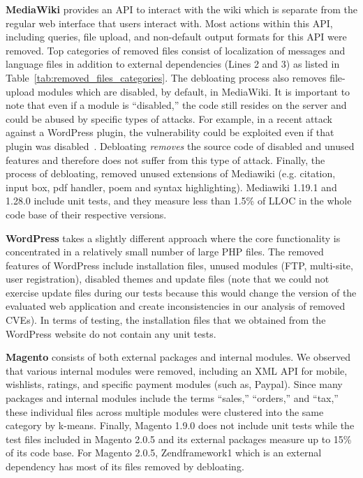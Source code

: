 \vspace{0.5ex}
\noindent\textbf{MediaWiki} provides an API to interact with the wiki which is separate from the regular web interface that users interact with. Most actions within this API, including queries, file upload, and non-default output formats for this API were removed. Top categories of removed files consist of localization of messages and language files in addition to external dependencies (Lines 2 and 3) as listed in Table~\ref{tab:removed_files_categories}. The debloating process also removes file-upload modules which are disabled, by default, in MediaWiki. It is important to note that even if a module is ``disabled,'' the code still resides on the server and could be abused by specific types of attacks. For example, in a recent attack against a WordPress plugin, the vulnerability could be exploited even if that plugin was disabled~\cite{wordpressPlugin}. Debloating \textit{removes} the source code of disabled and unused features and therefore does not suffer from this type of attack.
Finally, the process of debloating, removed unused extensions of Mediawiki (e.g. citation, input box, pdf handler, poem and syntax highlighting). Mediawiki 1.19.1 and 1.28.0 include unit tests, and they measure less than 1.5\% of LLOC in the whole code base of their respective versions.

\vspace{0.5ex}
\noindent\textbf{WordPress} takes a slightly different approach where the core functionality is concentrated in a relatively small number of large PHP files. The removed features of WordPress include installation files, unused modules (FTP, multi-site, user registration), disabled themes and update files (note that we could not exercise update files during our tests because this would change the version of the evaluated web application and create inconsistencies in our analysis of removed CVEs). In terms of testing, the installation files that we obtained from the WordPress website do not contain any unit tests.

\vspace{0.5ex}
\noindent\textbf{Magento} consists of both external packages and internal modules. We observed that various internal modules were removed, including an XML API for mobile, wishlists, ratings, and specific payment modules (such as, Paypal). Since many packages and internal modules include the terms ``sales,'' ``orders,'' and ``tax,'' these individual files across multiple modules were clustered into the same category by k-means. Finally, Magento 1.9.0 does not include unit tests while the test files included in Magento 2.0.5 and its external packages measure up to 15\% of its code base. For Magento 2.0.5, Zendframework1 which is an external dependency has most of its files removed by debloating.

